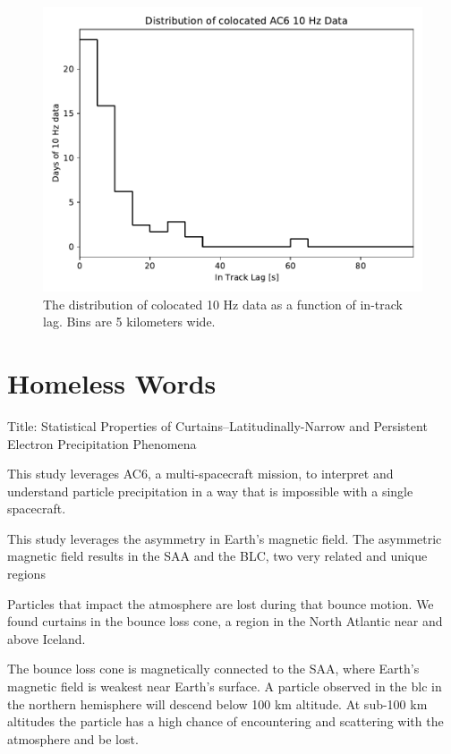 \documentclass[draft]{agujournal2019}
\begin{document}
\begin{figure}
\includegraphics[width=\textwidth]{a_10hz_dist.pdf}
\caption{The distribution of colocated 10 Hz data as a function of in-track lag. Bins are 5 kilometers wide.}
\label{a_10Hz_dist}
\end{figure}

\section{Homeless Words}

Title: Statistical Properties of Curtains--Latitudinally-Narrow and Persistent Electron Precipitation Phenomena

This study leverages AC6, a multi-spacecraft mission, to interpret and understand particle precipitation in a way that is impossible with a single spacecraft.

This study leverages the asymmetry in Earth's magnetic field. The asymmetric magnetic field results in the SAA and the BLC, two very related and unique regions

Particles that impact the atmosphere are lost during that bounce motion. We found curtains in the bounce loss cone, a region in the North Atlantic near and above Iceland.

The bounce loss cone is magnetically connected to the SAA, where Earth's magnetic field is weakest near Earth's surface. A particle observed in the blc in the northern hemisphere will descend below 100 km altitude. At sub-100 km altitudes the particle has a high chance of encountering and scattering with the atmosphere and be lost. 
\end{document}
